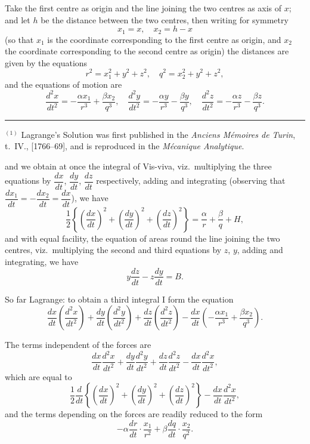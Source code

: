 \documentclass[12pt,a4paper]{article}
\theoremstyle{plain}
\theoremstyle{definition}
\begin{document}
Take the first centre as origin and the line joining the two centres as axis of $x$; and let $h$ be the distance between the two centres, then writing for symmetry
\[
x_1 = x, \quad x_2 = h - x
\]
(so that $x_1$ is the coordinate corresponding to the first centre as origin, and $x_2$ the coordinate corresponding to the second centre as origin) the distances are given by the equations
\[
r^2 = x_1^2 + y^2 + z^2, \quad q^2 = x_2^2 + y^2 + z^2,
\]
and the equations of motion are
\[
\frac{d^2x}{dt^2} = -\frac{\alpha x_1}{r^3} + \frac{\beta x_2}{q^3}, \quad
\frac{d^2y}{dt^2} = -\frac{\alpha y}{r^3} - \frac{\beta y}{q^3}, \quad
\frac{d^2z}{dt^2} = -\frac{\alpha z}{r^3} - \frac{\beta z}{q^3}.
\]

\rule{0.5\textwidth}{0.4pt}

$^{(1)}$ Lagrange's Solution was first published in the \textit{Anciens M\'{e}moires de Turin}, t.~IV., [1766--69], and is reproduced in the \textit{M\'{e}canique Analytique}.

\newpage
[182]

and we obtain at once the integral of Vis-viva, viz.\ multiplying the three equations by $\dfrac{dx}{dt}$, $\dfrac{dy}{dt}$, $\dfrac{dz}{dt}$ respectively, adding and integrating (observing that $\dfrac{dx_1}{dt} = -\dfrac{dx_2}{dt} = \dfrac{dx}{dt}$), we have
\[
\frac{1}{2}\left\{\left(\frac{dx}{dt}\right)^2 + \left(\frac{dy}{dt}\right)^2 + \left(\frac{dz}{dt}\right)^2\right\} = \frac{\alpha}{r} + \frac{\beta}{q} + H, \tag{1, $a$}
\]
and with equal facility, the equation of areas round the line joining the two centres, viz.\ multiplying the second and third equations by $z$, $y$, adding and integrating, we have
\[
y\frac{dz}{dt} - z\frac{dy}{dt} = B. \tag{2, $a$}
\]

So far Lagrange: to obtain a third integral I form the equation
\[
\frac{dx}{dt}\left(\frac{d^2x}{dt^2}\right) + \frac{dy}{dt}\left(\frac{d^2y}{dt^2}\right) + \frac{dz}{dt}\left(\frac{d^2z}{dt^2}\right) - \frac{dx}{dt}\left(-\frac{\alpha x_1}{r^3} + \frac{\beta x_2}{q^3}\right).
\]

The terms independent of the forces are
\[
\frac{dx}{dt}\frac{d^2x}{dt^2} + \frac{dy}{dt}\frac{d^2y}{dt^2} + \frac{dz}{dt}\frac{d^2z}{dt^2} - \frac{dx}{dt}\frac{d^2x}{dt^2},
\]
which are equal to
\[
\frac{1}{2}\frac{d}{dt}\left\{\left(\frac{dx}{dt}\right)^2 + \left(\frac{dy}{dt}\right)^2 + \left(\frac{dz}{dt}\right)^2\right\} - \frac{dx}{dt}\frac{d^2x}{dt^2},
\]
and the terms depending on the forces are readily reduced to the form
\[
-\alpha\frac{dr}{dt} \cdot \frac{x_1}{r^2} + \beta\frac{dq}{dt} \cdot \frac{x_2}{q^2}.
\]
\end{document}
